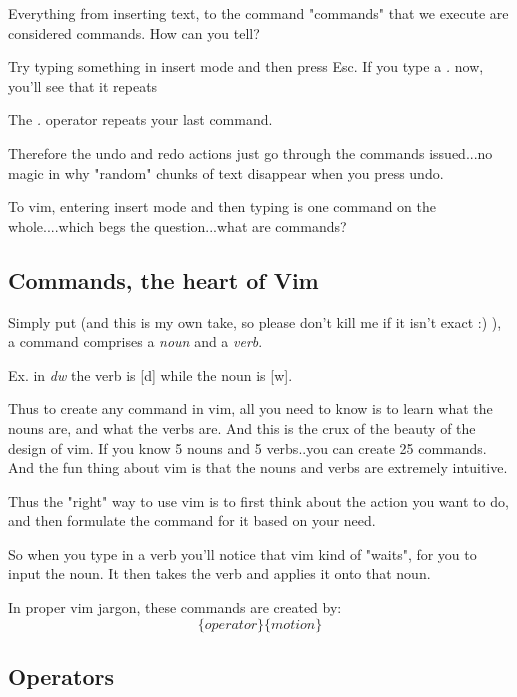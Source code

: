 \documentclass[12pt, letterpaper]{article}
\begin{document}
Everything from inserting text, to the command "commands" that we execute are considered commands. How can you tell?

Try typing something in insert mode and then press Esc. If you type a \textit{.} now, you'll see that it repeats

The \textit{.} operator repeats your last command. 

Therefore the undo and redo actions just go through the commands issued...no magic in why "random" chunks of text disappear when you press undo.

To vim, entering insert mode and then typing is one command on the whole....which begs the question...what are commands?

\subsection{Commands, the heart of Vim}
Simply put (and this is my own take, so please don't kill me if it isn't exact :) ), a command comprises a \textit{noun} and a \textit{verb}.

Ex. in \textit{dw} the verb is [d] while the noun is [w].

Thus to create any command in vim, all you need to know is to learn what the nouns are, and what the verbs are. And this is the crux of the beauty of the design of vim. If you know 5 nouns and 5 verbs..you can create 25 commands. And the fun thing about vim is that the nouns and verbs are extremely intuitive.

Thus the "right" way to use vim is to first think about the action you want to do, and then formulate the command for it based on your need.

So when you type in a verb you'll notice that vim kind of "waits", for you to input the noun. It then takes the verb and applies it onto that noun.

In proper vim jargon, these commands are created by:
$$\{operator\}\{motion\}$$

\subsection{Operators}
\end{document}
